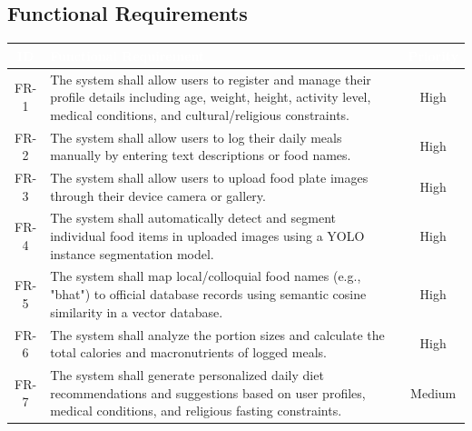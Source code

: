 \documentclass[11pt,a4paper]{article}
\newcommand{\reqheader}[3]{%
  \rowcolor{srsnavy}
  \textcolor{white}{\textbf{#1}} &
  \textcolor{white}{\textbf{#2}} &
  \textcolor{white}{\textbf{#3}} \\ \hline}
\begin{document}
\subsection{Functional Requirements}
\renewcommand{\arraystretch}{1.35}
\begin{tabularx}{\textwidth}{|c|X|c|}
\hline
\reqheader{ID}{Functional Requirement}{Priority}
FR-1 & The system shall allow users to register and manage their profile details including age, weight, height, activity level, medical conditions, and cultural/religious constraints. & High \\ \hline
FR-2 & The system shall allow users to log their daily meals manually by entering text descriptions or food names. & High \\ \hline
FR-3 & The system shall allow users to upload food plate images through their device camera or gallery. & High \\ \hline
FR-4 & The system shall automatically detect and segment individual food items in uploaded images using a YOLO instance segmentation model. & High \\ \hline
FR-5 & The system shall map local/colloquial food names (e.g., "bhat") to official database records using semantic cosine similarity in a vector database. & High \\ \hline
FR-6 & The system shall analyze the portion sizes and calculate the total calories and macronutrients of logged meals. & High \\ \hline
FR-7 & The system shall generate personalized daily diet recommendations and suggestions based on user profiles, medical conditions, and religious fasting constraints. & Medium \\ \hline
\end{tabularx}
\end{document}
